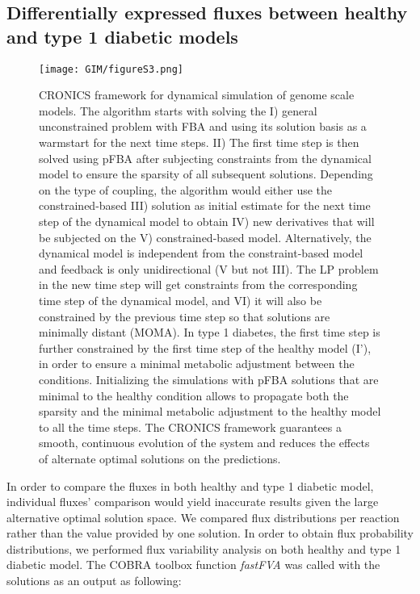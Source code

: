 \subsection{Differentially expressed fluxes between healthy and type 1 diabetic models} \label{GIM:sp5}
\begin{figure}[!htp]
\centering
	\texttt{[image: GIM/figureS3.png]}%
	\caption[CRONICS framework for dynamical simulation of genome scale models.]{CRONICS framework for dynamical simulation of genome scale models. The algorithm starts with solving the I) general unconstrained problem with FBA and using its solution basis as a warmstart for the next time steps. II) The first time step is then solved using pFBA after subjecting constraints from the dynamical model to ensure the sparsity of all subsequent solutions. Depending on the type of coupling, the algorithm would either use the constrained-based III) solution as initial estimate for the next time step of the dynamical model to obtain IV) new derivatives that will be subjected on the V) constrained-based model. Alternatively, the dynamical model is independent from the constraint-based model and feedback is only unidirectional (V but not III). The LP problem in the new time step will get constraints from the corresponding time step of the dynamical model, and VI) it will also be constrained by the previous time step so that solutions are minimally distant (MOMA). In type 1 diabetes, the first time step is further constrained by the first time step of the healthy model (I’), in order to ensure a minimal metabolic adjustment between the conditions. Initializing the simulations with pFBA solutions that are minimal to the healthy condition allows to propagate both the sparsity and the minimal metabolic adjustment to the healthy model to all the time steps. The CRONICS framework guarantees a smooth, continuous evolution of the system and reduces the effects of alternate optimal solutions on the predictions.}
	\label{fig:s3GIM}
\end{figure}
In order to compare the fluxes in both healthy and type 1 diabetic model, individual fluxes' comparison would yield inaccurate results given the large alternative optimal solution space. We compared flux distributions per reaction rather than the value provided by one solution. In order to obtain flux probability distributions, we performed flux variability analysis on both healthy and type 1 diabetic model. The COBRA toolbox function \textit{fastFVA} \cite{gudmundsson2010computationally} was called with the solutions as an output as following:\\
